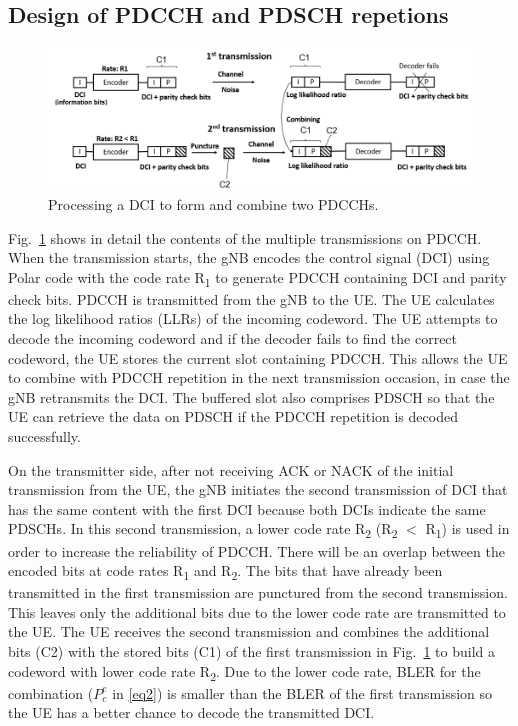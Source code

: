 \documentclass[conference,10pt]{IEEEtran}
\begin{document}
\subsection{Design of PDCCH and PDSCH repetions}\label{BB}
\begin{figure}[htb]
\centerline{\includegraphics[scale=0.35]{fig3.png}}
\caption{Processing a DCI to form and combine two PDCCHs.}
\label{fig3}
\end{figure}

Fig.~\ref{fig3} shows in detail the contents of the multiple transmissions on PDCCH. When the transmission starts, the gNB encodes the control signal (DCI) using Polar code with the code rate R\textsubscript{1} to generate PDCCH containing DCI and parity check bits. PDCCH is transmitted from the gNB to the UE. The UE calculates the log likelihood ratios (LLRs) of the incoming codeword. The UE attempts to decode the incoming codeword and if the decoder fails to find the correct codeword, the UE stores the current slot containing PDCCH. This allows the UE to combine with PDCCH repetition in the next transmission occasion, in case the gNB retransmits the DCI. The buffered slot also comprises PDSCH so that the UE can retrieve the data on PDSCH if the PDCCH repetition is decoded successfully.

On the transmitter side, after not receiving ACK or NACK of the initial transmission from the UE, the gNB initiates the second transmission of DCI that has the same content with the first
DCI because both DCIs indicate the same PDSCHs. In this second transmission, a lower code rate R\textsubscript{2} (R\textsubscript{2} $<$ R\textsubscript{1}) is used in order to increase the reliability of PDCCH. There will be an overlap between the encoded bits at code rates R\textsubscript{1} and R\textsubscript{2}. The bits that have already been transmitted in the first transmission are punctured from the second transmission. This leaves only the additional bits due to the lower code rate are transmitted to the UE. The UE receives the second transmission and combines the additional bits (C2) with the stored bits (C1) of the first transmission in Fig.~\ref{fig3} to build a codeword with lower code rate R\textsubscript{2}. Due to the lower code rate, BLER for the combination ($P^{e}_{c}$ in \eqref{eq2}) is smaller than the BLER of the first transmission so the UE has a better chance to decode the transmitted DCI.
\end{document}
